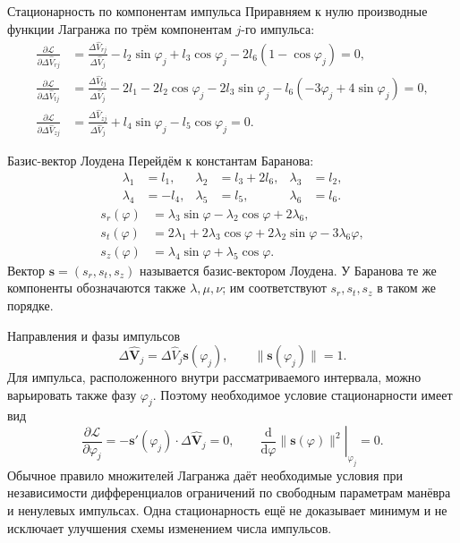 \documentclass[11pt,aspectratio=169,t]{beamer}
\newcommand{\eqcompact}{\fontsize{10}{12}\selectfont}
\begin{document}
\begin{frame}{Стационарность по компонентам импульса}
\relax
\derivationmathspacing
Приравняем к нулю производные функции Лагранжа по трём компонентам $j$-го импульса:
{\eqcompact\derivationmathspacing
\[
\begin{aligned}
 \frac{\partial\mathcal L}{\partial\Delta\widehat V_{rj}}
 &=\frac{\Delta\widehat V_{rj}}{\Delta\widehat V_j}
       -l_2\sin\varphi_j+l_3\cos\varphi_j-2l_6(1-\cos\varphi_j)=0,\\[2pt]
 \frac{\partial\mathcal L}{\partial\Delta\widehat V_{tj}}
 &=\frac{\Delta\widehat V_{tj}}{\Delta\widehat V_j}
       -2l_1-2l_2\cos\varphi_j-2l_3\sin\varphi_j
       -l_6(-3\varphi_j+4\sin\varphi_j)=0,\\[2pt]
 \frac{\partial\mathcal L}{\partial\Delta\widehat V_{zj}}
 &=\frac{\Delta\widehat V_{zj}}{\Delta\widehat V_j}
       +l_4\sin\varphi_j-l_5\cos\varphi_j=0.
\end{aligned}
\]
}
\end{frame}

\begin{frame}{Базис-вектор Лоудена}
\relax
\derivationmathspacing
Перейдём к константам Баранова:
{\derivationmathspacing
\[
\boxed{\begin{aligned}
 \lambda_1&=l_1,&\lambda_2&=l_3+2l_6,&\lambda_3&=l_2,\\
 \lambda_4&=-l_4,&\lambda_5&=l_5,&\lambda_6&=l_6.
\end{aligned}}
\]
}{\derivationmathspacing
\[
\boxed{\begin{aligned}
 s_r(\varphi)&=\lambda_3\sin\varphi-\lambda_2\cos\varphi+2\lambda_6,\\
 s_t(\varphi)&=2\lambda_1+2\lambda_3\cos\varphi
                         +2\lambda_2\sin\varphi-3\lambda_6\varphi,\\
 s_z(\varphi)&=\lambda_4\sin\varphi+\lambda_5\cos\varphi.
\end{aligned}}
\]
}
\medskip
\justifying
Вектор $\boldsymbol s=(s_r,s_t,s_z)$ называется базис-вектором Лоудена.
У Баранова те же компоненты обозначаются также $\lambda,\mu,\nu$;
им соответствуют $s_r,s_t,s_z$ в таком же порядке.
\end{frame}

\begin{frame}{Направления и фазы импульсов}
\relax
\derivationmathspacing
{\derivationmathspacing
\[
\Delta\widehat{\boldsymbol V}_j=
           \Delta\widehat V_j\boldsymbol s(\varphi_j),
 \qquad \|\boldsymbol s(\varphi_j)\|=1.
\]
}
\justifying
Для импульса, расположенного внутри рассматриваемого интервала,
можно варьировать также фазу $\varphi_j$.
Поэтому необходимое условие стационарности имеет вид
{\derivationmathspacing
\[
\frac{\partial\mathcal L}{\partial\varphi_j}
 =-\boldsymbol s'(\varphi_j)\cdot\Delta\widehat{\boldsymbol V}_j=0,
 \qquad
 \left.\frac{\mathrm d}{\mathrm d\varphi}\|\boldsymbol s(\varphi)\|^2
                  \right|_{\varphi_j}=0.
\]
}
\medskip
\justifying
Обычное правило множителей Лагранжа даёт необходимые условия
при независимости дифференциалов ограничений по свободным
параметрам манёвра и ненулевых импульсах.
Одна стационарность ещё не доказывает минимум и не исключает
улучшения схемы изменением числа импульсов.
\end{frame}
\end{document}
